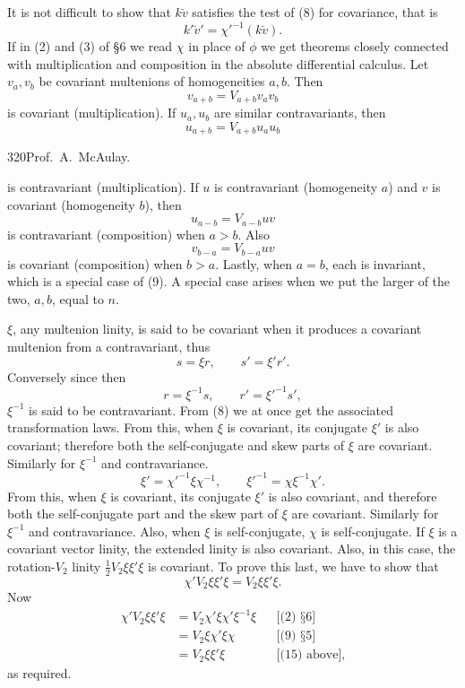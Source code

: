\documentclass[11pt]{article}
\begin{document}
\indent It is not difficult to show that $k\breve v$ satisfies the test of (8) for covariance, that is
\[k'\breve v'=\chi'^{-1}(k\breve v).\]
If in (2) and (3) of §6 we read $\chi$ in place of $\phi$ we get theorems closely connected with multiplication and composition in the absolute differential calculus. Let $v_a,v_b$ be covariant multenions of homogeneities $a,b$. Then
\begin{equation}v_{a+b}=V_{a+b}v_av_b\tag{9}\end{equation}
is covariant (multiplication). If $u_a,u_b$ are similar contravariants, then
\begin{equation}u_{a+b}=V_{a+b}u_au_b\tag{10}\end{equation}
\newpage\thispagestyle{empty}\begin{center}320\hfill Prof.\ A.\ McAulay.\end{center}
is contravariant (multiplication). If $u$ is contravariant (homogeneity $a$) and $v$ is covariant (homogeneity $b$), then
\begin{equation}u_{a-b}=V_{a-b}uv\tag{11}\end{equation}
is contravariant (composition) when $a>b$. Also
\begin{equation}v_{b-a}=V_{b-a}uv\tag{12}\end{equation}
is covariant (composition) when $b>a$. Lastly, when $a=b$, each is invariant, which is a special case of (9). A special case arises when we put the larger of the two, $a,b$, equal to $n$.

\indent $\xi$, any multenion linity, is said to be covariant when it produces a covariant multenion from a contravariant, thus
\begin{equation}s=\xi r,\qquad s'=\xi'r'.\tag{13}\end{equation}
Conversely since then
\begin{equation}r=\xi^{-1}s,\qquad r'=\xi'^{-1}s',\tag{14}\end{equation}
$\xi^{-1}$ is said to be contravariant. From (8) we at once get the associated transformation laws. From this, when $\xi$ is covariant, its conjugate $\xi'$ is also covariant; therefore both the self-conjugate and skew parts of $\xi$ are covariant. Similarly for $\xi^{-1}$ and contravariance.
\begin{equation}\xi'=\chi'^{-1}\xi\chi^{-1},\qquad \xi'^{-1}=\chi\xi^{-1}\chi'.\tag{15}\end{equation}
From this, when $\xi$ is covariant, its conjugate $\xi'$ is also covariant, and therefore both the self-conjugate part and the skew part of $\xi$ are covariant. Similarly for $\xi^{-1}$ and contravariance. Also, when $\xi$ is self-conjugate, $\chi$ is self-conjugate. If $\xi$ is a covariant vector linity, the extended linity is also covariant. Also, in this case, the rotation-$V_2$ linity $\tfrac12V_2\xi\xi'\xi$ is covariant. To prove this last, we have to show that
\[\chi'V_2\xi\xi'\xi=V_2\xi\xi'\xi.\]
Now
\[\begin{aligned}\chi'V_2\xi\xi'\xi&=V_2\chi'\xi\chi'\xi^{-1}\xi &&\text{[(2) §6]}\\&=V_2\xi\chi'\xi\chi &&\text{[(9) §5]}\\&=V_2\xi\xi'\xi &&\text{[(15) above],}\end{aligned}\]
as required.
\end{document}
